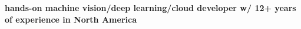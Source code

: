 \onehalfspace
\textbf{\large hands-on machine vision/deep learning/cloud developer w/ 12+ years of experience in North America}
\singlespace

\vspace{0.8cm}
